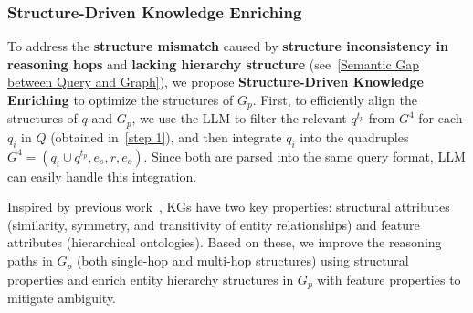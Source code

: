 \documentclass[11pt]{article}
\begin{document}

\subsubsection{Structure-Driven Knowledge Enriching}
\label{Structure-Driven Knowledge Enrichment}
To address the \textbf{structure mismatch} caused by \textbf{structure inconsistency in reasoning hops} and \textbf{lacking hierarchy structure} (see~\ref{Semantic Gap between Query and Graph}), we propose \textbf{Structure-Driven Knowledge Enriching} to optimize the structures of $G_p$.
First, to efficiently align the structures of $q$ and $G_p$, we use the LLM to filter the relevant $q^{t_p}$ from $G^4$ for each $q_i$ in $Q$ (obtained in~\ref{step 1}), and then integrate $q_i$ into the quadruples $G^4 = (q_i \cup q^{t_p}, e_s, r, e_o)$. Since both are parsed into the same query format, LLM can easily handle this integration.

Inspired by previous work~\cite{han2025retrievalaugmentedgenerationgraphsgraphrag, article2}, KGs have two key properties: structural attributes (similarity, symmetry, and transitivity of entity relationships) and feature attributes (hierarchical ontologies). Based on these, we improve the reasoning paths in $G_p$ (both single-hop and multi-hop structures) using structural properties and enrich entity hierarchy structures in $G_p$ with feature properties to mitigate ambiguity.
\end{document}
